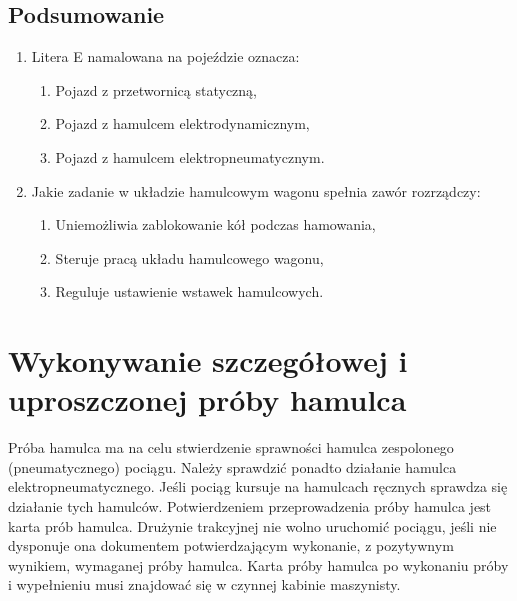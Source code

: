 \section{Podsumowanie}
\begin{tcolorbox}[colback=black!5!white,colframe=green!75!black,width=18cm,title=Podsumowanie rozdziału]
	\begin{enumerate}
	\item Litera E namalowana na pojeździe oznacza:
	\begin{enumerate}
		\item Pojazd z przetwornicą statyczną,
		\item Pojazd z hamulcem elektrodynamicznym,
		\item Pojazd z hamulcem elektropneumatycznym.
	\end{enumerate}	
	\item Jakie zadanie w układzie hamulcowym wagonu spełnia zawór rozrządczy:
	\begin{enumerate}
		\item Uniemożliwia zablokowanie kół podczas hamowania,
		\item Steruje pracą układu hamulcowego wagonu,
		\item Reguluje ustawienie wstawek hamulcowych.
	\end{enumerate}
	\end{enumerate}
\end{tcolorbox}

\chapter{Wykonywanie szczegółowej i uproszczonej próby hamulca}

Próba hamulca ma na celu stwierdzenie sprawności hamulca zespolonego (pneumatycznego) pociągu. Należy sprawdzić ponadto działanie hamulca elektropneumatycznego. Jeśli pociąg kursuje na hamulcach ręcznych sprawdza się działanie tych hamulców. Potwierdzeniem przeprowadzenia próby hamulca jest karta prób hamulca. Drużynie trakcyjnej nie wolno uruchomić pociągu, jeśli nie dysponuje ona dokumentem potwierdzającym wykonanie, z pozytywnym wynikiem, wymaganej próby hamulca.
Karta próby hamulca po wykonaniu próby i wypełnieniu musi znajdować się w czynnej kabinie maszynisty.

